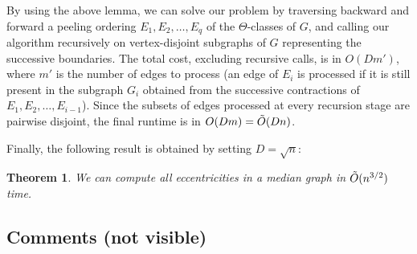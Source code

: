 \documentclass[11pt,letterpaper]{article}
\newtheorem{theorem}{Theorem}
\begin{document}
By using the above lemma, we can solve our problem by traversing backward and forward a peeling ordering $E_1,E_2,\ldots,E_q$ of the $\Theta$-classes of $G$, and calling our algorithm recursively on vertex-disjoint subgraphs of $G$ representing the successive boundaries. The total cost, excluding recursive calls, is in ${O}(Dm')$, where $m'$ is the number of edges to process (an edge of $E_i$ is processed if it is still present in the subgraph $G_i$ obtained from the successive contractions of $E_1,E_2,\ldots,E_{i-1}$). Since the subsets of edges processed at every recursion stage are pairwise disjoint, the final runtime is in ${O}(Dm) = \Tilde{O}(Dn)$.

\smallskip
Finally, the following result is obtained by setting $D = \sqrt{n}$:
\begin{theorem}
    We can compute all eccentricities in a median graph in $\Tilde{O}(n^{3/2})$ time.
\end{theorem}

\subsection{Comments (not visible)}
\end{document}
